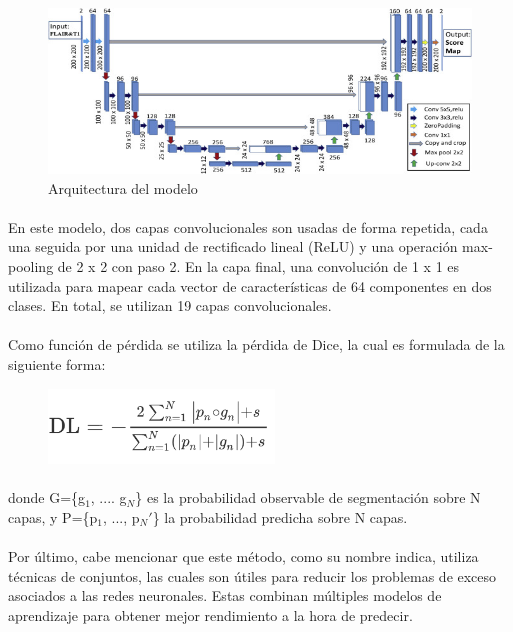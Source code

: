 \documentclass[12pt]{article}
\begin{document}
	\begin{figure}[h!]
	\centering
		\includegraphics[width=\linewidth]{img1.jpg}
		\caption[\textit{Arquitectura del modelo}]{Arquitectura del modelo}
		\label{fig:FCC}
	\end{figure}

	\paragraph{}
	En este modelo, dos capas convolucionales son usadas de forma repetida, cada una seguida por una unidad de rectificado lineal (ReLU) y una operación max-pooling de 2 x 2 con paso 2. En la capa final, una convolución de 1 x 1 es utilizada para mapear cada vector de características de 64 componentes en dos clases. En total, se utilizan 19 capas convolucionales. 
	
	\paragraph{}
	Como función de pérdida se utiliza la pérdida de Dice, la cual es formulada de la siguiente forma:
	
	\begin{figure}[H]
	 	\centering
		\includegraphics[height=2cm]{dice_loss.png}
		\label{fig:Dice}
	\end{figure}
	
	\paragraph{}
	donde G=\{g$_{1}$, .... g$_{N}$\} es la probabilidad observable de segmentación sobre N capas, y P=\{p$_{1}$, ..., p$_{N}'$\} la probabilidad predicha sobre N capas.
	
	\paragraph{}
	Por último, cabe mencionar que este método, como su nombre indica, utiliza técnicas de conjuntos, las cuales son útiles para reducir los problemas de exceso asociados a las redes neuronales. Estas combinan múltiples modelos de aprendizaje para obtener mejor rendimiento a la hora de predecir.
	
\end{document}
